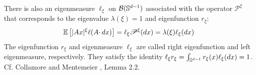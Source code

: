 There is also an eigenmeasure $\ell_\xi$ on $\mathcal B(\mathbb S^{d-1})$
associated with the operator $\mathscr P^\xi$ that corresponds to the
eigenvalue $\lambda(\xi) = 1$ and eigenfunction $r_\xi$:
\begin{equation}
  \label{eq:eigenmeasure}
  \mathbb{E} \left[ |A x|^\xi \ell(A \cdotp dx) \right]
  = \ell_\xi \mathscr P^\xi (dx)
  = \lambda(\xi) \ell_\xi(dx)
\end{equation}
The eigenfunction $r_\xi$ and eigenmeasure $\ell_\xi$ are called
right eigenfunction and left eigenmeasure, respectively. They
satisfy the identity
$\ell_\xi r_\xi = \int_{\mathbb S^{d-1}} r_\xi(x) \ell_\xi(dx) = 1$.
Cf. Collamore and Mentemeier \cite{collamore:mentemeier:2016},
Lemma 2.2.


